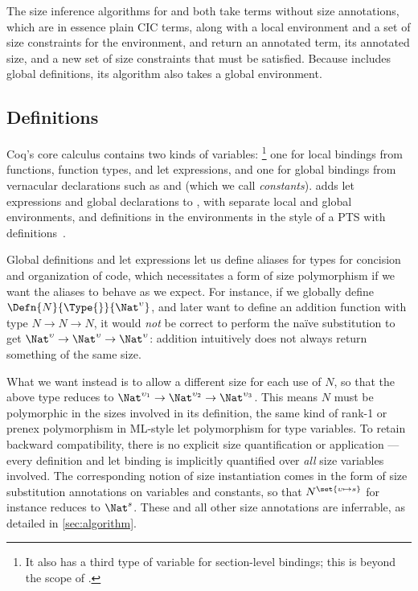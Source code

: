 The size inference algorithms for \CIChat and \lang both take terms without size annotations,
which are in essence plain CIC terms, along with a local environment
and a set of size constraints for the environment,
and return an annotated term, its annotated size, and a new set of size constraints that must be satisfied.
Because \lang includes global definitions, its algorithm also takes a global environment.

\subsection{Definitions}

Coq's core calculus contains two kinds of variables:%
\footnote{It also has a third type of variable for section-level bindings;
this is beyond the scope of \lang.}
one for local bindings from functions, function types, and let expressions,
and one for global bindings from vernacular declarations such as  and  (which we call \textit{constants}).
\lang adds let expressions and global declarations to \CIChat,
with separate local and global environments,
and definitions in the environments in the style of a PTS with definitions~\citep{PTSD}.

Global definitions and let expressions let us define aliases for types for concision and organization of code,
which necessitates a form of size polymorphism if we want the aliases to behave as we expect.
For instance, if we globally define $\Defn{N}{\Type{}}{\Nat^\upsilon}$,
and later want to define an addition function with type $N \rightarrow N \rightarrow N$,
it would \emph{not} be correct to perform the na\"ive substitution to get $\Nat^\upsilon \rightarrow \Nat^\upsilon \rightarrow \Nat^\upsilon$:
addition intuitively does not always return something of the same size.

What we want instead is to allow a different size for each use of $N$,
so that the above type reduces to $\Nat^{\upsilon_1} \rightarrow \Nat^{\upsilon_2} \rightarrow \Nat^{\upsilon_3}$.
This means $N$ must be polymorphic in the sizes involved in its definition,
the same kind of rank-1 or prenex polymorphism in ML-style let polymorphism for type variables.
To retain backward compatibility, there is no explicit size quantification or application ---
every definition and let binding is implicitly quantified over \emph{all} size variables involved.
The corresponding notion of size instantiation comes in the form of size substitution annotations on variables and constants, so that $N^{\set{\upsilon \mapsto s}}$ for instance reduces to $\Nat^s$.
These and all other size annotations are inferrable, as detailed in \autoref{sec:algorithm}.

